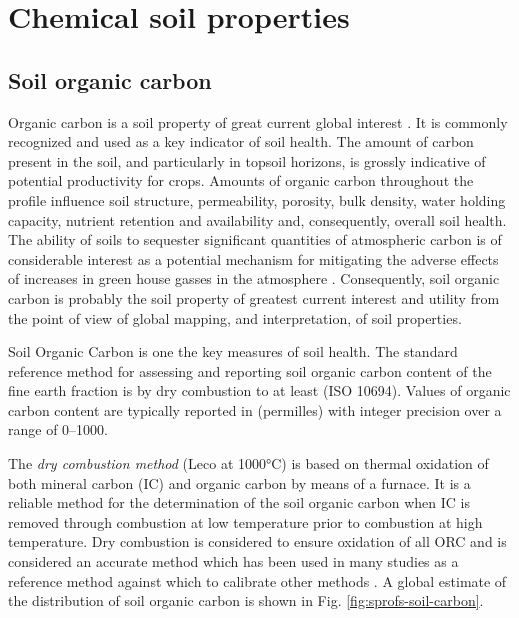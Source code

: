 \documentclass[graybox,natbib,nospthms,UStrade]{svmono}
\let\BeginKnitrBlock\begin \let\EndKnitrBlock\end
\let\BeginKnitrBlock\begin \let\EndKnitrBlock\end
\begin{document}
\hypertarget{chemical-soil-properties}{%
\section{Chemical soil properties}\label{chemical-soil-properties}}

\hypertarget{soil-organic-carbon}{%
\subsection{Soil organic carbon}\label{soil-organic-carbon}}

Organic carbon is a soil property of great current global interest
\citep{Smith2004SUM, Smith2010CUP, Panagos2013439}. It is commonly
recognized and used as a key indicator of soil health. The amount of
carbon present in the soil, and particularly in topsoil horizons, is
grossly indicative of potential productivity for crops. Amounts of
organic carbon throughout the profile influence soil structure,
permeability, porosity, bulk density, water holding capacity, nutrient
retention and availability and, consequently, overall soil health. The
ability of soils to sequester significant quantities of atmospheric
carbon is of considerable interest as a potential mechanism for
mitigating the adverse effects of increases in green house gasses in the
atmosphere \citep{Smith2004SUM, Conant2010, Scharlemann2014CM}.
Consequently, soil organic carbon is probably the soil property of
greatest current interest and utility from the point of view of global
mapping, and interpretation, of soil properties.

\BeginKnitrBlock{rmdnote}
Soil Organic Carbon is one the key measures of soil health.
The standard reference method for assessing and reporting soil organic
carbon content of the fine earth fraction is by dry combustion to at
least (ISO 10694). Values of organic carbon content are typically reported in
(permilles) with integer precision over a range of 0--1000.
\EndKnitrBlock{rmdnote}

The \emph{dry combustion method} (Leco at 1000°C) is based on thermal oxidation of
both mineral carbon (IC) and organic carbon by means of a furnace.
It is a reliable method for the determination of the soil organic carbon when IC is
removed through combustion at low temperature prior to combustion at
high temperature. Dry combustion is considered to ensure oxidation of
all ORC and is considered an accurate method which has been used in many
studies as a reference method against which to calibrate other methods
\citep{Grewal1991JSS, Meersmans2009SUM, Bisutti2004TAC}. A global estimate
of the distribution of soil organic carbon is shown in
Fig. \ref{fig:sprofs-soil-carbon}.
\end{document}
